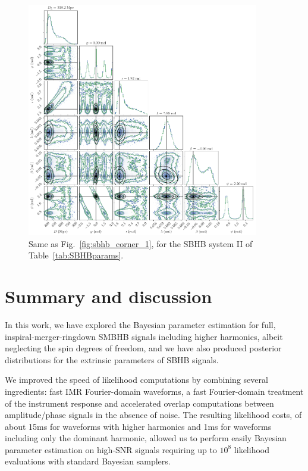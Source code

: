 \documentclass[aps,showpacs,twocolumn,prd,superscriptaddress,nofootinbib]{revtex4-1}
\begin{document}
\begin{figure}
	\includegraphics[width=0.9\textwidth]{../plots/corner_sobh_tdc2_extr_ptmcmc_bambi}
	\caption{Same as Fig.~\ref{fig:sbhb_corner_1}, for the SBHB system II of Table~\ref{tab:SBHBparams}.}
	\label{fig:sbhb_corner_12}
\end{figure}


\section{Summary and discussion}
\label{sec:summarydiscussion}

In this work, we have explored the Bayesian parameter estimation for full, inspiral-merger-ringdown SMBHB signals including higher harmonics, albeit neglecting the spin degrees of freedom, and we have also produced posterior distributions for the extrinsic parameters of SBHB signals.

We improved the speed of likelihood computations by combining several ingredients: fast IMR Fourier-domain waveforms, a fast Fourier-domain treatment of the instrument response and accelerated overlap computations between amplitude/phase signals in the absence of noise. The resulting likelihood costs, of about 15ms for waveforms with higher harmonics and 1ms for waveforms including only the dominant harmonic, allowed us to perform easily Bayesian parameter estimation on high-SNR signals requiring up to $10^{8}$ likelihood evaluations with standard Bayesian samplers.
\end{document}
